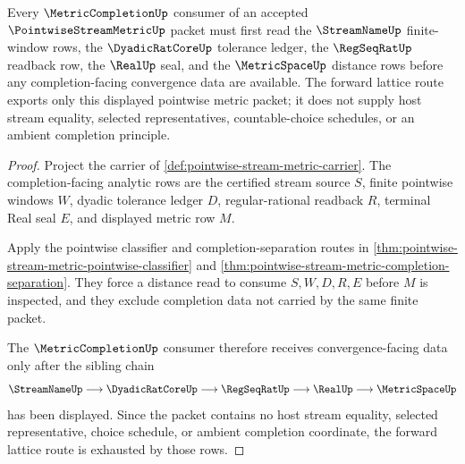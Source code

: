 \begin{theorem}
\label{thm:pointwise-stream-metric-sibling-anchor}
Every $\MetricCompletionUp$ consumer of an accepted $\PointwiseStreamMetricUp$ packet must first read the $\StreamNameUp$ finite-window rows, the $\DyadicRatCoreUp$ tolerance ledger, the $\RegSeqRatUp$ readback row, the $\RealUp$ seal, and the $\MetricSpaceUp$ distance rows before any completion-facing convergence data are available. The forward lattice route exports only this displayed pointwise metric packet; it does not supply host stream equality, selected representatives, countable-choice schedules, or an ambient completion principle.
\end{theorem}
\begin{proof}
Project the carrier of \autoref{def:pointwise-stream-metric-carrier}. The completion-facing analytic rows are the certified stream source $S$, finite pointwise windows $W$, dyadic tolerance ledger $D$, regular-rational readback $R$, terminal Real seal $E$, and displayed metric row $M$.

Apply the pointwise classifier and completion-separation routes in \autoref{thm:pointwise-stream-metric-pointwise-classifier} and \autoref{thm:pointwise-stream-metric-completion-separation}. They force a distance read to consume $S,W,D,R,E$ before $M$ is inspected, and they exclude completion data not carried by the same finite packet.

The $\MetricCompletionUp$ consumer therefore receives convergence-facing data only after the sibling chain
$$
\StreamNameUp \longrightarrow \DyadicRatCoreUp \longrightarrow \RegSeqRatUp \longrightarrow \RealUp \longrightarrow \MetricSpaceUp
$$
has been displayed. Since the packet contains no host stream equality, selected representative, choice schedule, or ambient completion coordinate, the forward lattice route is exhausted by those rows.
\end{proof}

